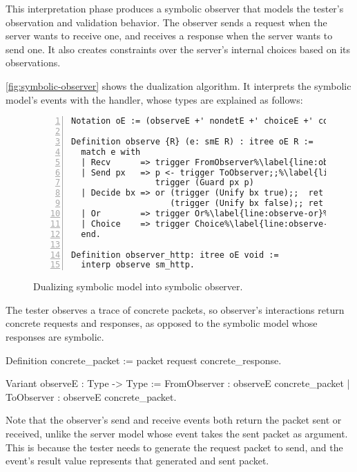This interpretation phase produces a symbolic observer that models the tester's
observation and validation behavior.  The observer sends a request when the
server wants to receive one, and receives a response when the server wants to
send one.  It also creates constraints over the server's internal choices based
on its observations.

\autoref{fig:symbolic-observer} shows the dualization algorithm.  It interprets
the symbolic model's events with the  handler, whose types are
explained as follows:

\begin{figure}
\begin{lstlisting}[numbers=left]
Notation oE := (observeE +' nondetE +' choiceE +' constraintE).

Definition observe {R} (e: smE R) : itree oE R :=
  match e with
  | Recv      => trigger FromObserver%\label{line:observe-absorb}%
  | Send px   => p <- trigger ToObserver;;%\label{line:observe-emit}%
                 trigger (Guard px p)
  | Decide bx => or (trigger (Unify bx true);;  ret true)%\label{line:observe-branch}%
                    (trigger (Unify bx false);; ret false)
  | Or        => trigger Or%\label{line:observe-or}%
  | Choice    => trigger Choice%\label{line:observe-choice}%
  end.

Definition observer_http: itree oE void :=
  interp observe sm_http.
\end{lstlisting}
\caption{Dualizing symbolic model into symbolic observer.}
\label{fig:symbolic-observer}
\end{figure}

The tester observes a trace of concrete packets, so observer's interactions
return concrete requests and responses, as opposed to the symbolic model whose
responses are symbolic.
\begin{coq}
  Definition concrete_packet := packet request concrete_response.

  Variant observeE : Type -> Type :=
    FromObserver   : observeE concrete_packet
  | ToObserver     : observeE concrete_packet.
\end{coq}

Note that the observer's send and receive events both return the packet sent or
received, unlike the server model whose  event takes the sent packet
as argument.  This is because the tester needs to generate the request packet to
send, and the event's result value represents that generated and sent packet.

